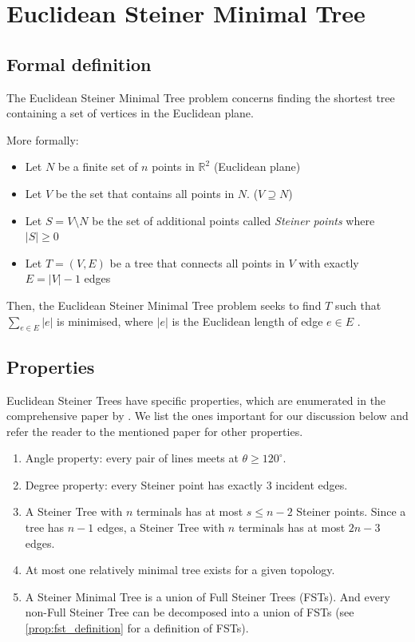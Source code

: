 \documentclass{l4proj}
\begin{document}
\section{Euclidean Steiner Minimal Tree}

\subsection{Formal definition}
The Euclidean Steiner Minimal Tree problem concerns finding the shortest tree containing a set of vertices in the Euclidean plane.

More formally:
\begin{itemize}
    \item Let $N$ be a finite set of $n$ points in $\mathbb{R}^2$ (Euclidean plane)
    \item Let $V$ be the set that contains all points in $N$. ($V \supseteq N$)
    \item Let $S = V \setminus N$ be the set of additional points called \textit{Steiner points} where $|S| \geq 0$
    \item Let $T = (V, E)$ be a tree that connects all points in $V$ with exactly $E = |V| - 1$ edges
\end{itemize}

Then, the Euclidean Steiner Minimal Tree problem seeks to find $T$ such that $\sum_{e \in E} |e|$ is minimised, where $|e|$ is the Euclidean length of edge $e \in E$ \citep{Brazil2014}.

\subsection{Properties}
\label{sec:esmt_properties}
Euclidean Steiner Trees have specific properties, which are enumerated in the comprehensive paper by \cite{Gilbert1968SteinerMT}. We list the ones important for our discussion below and refer the reader to the mentioned paper for other properties.

\begin{enumerate}
    \item Angle property: every pair of lines meets at $\theta \geq 120^\circ$.
    \item Degree property: every Steiner point has exactly 3 incident edges.
    \item \label{prop:esmt_fst} A Steiner Tree with $n$ terminals has at most $s \leq n - 2$ Steiner points. Since a tree has $n - 1$ edges, a Steiner Tree with $n$ terminals has at most $2n - 3$ edges.
    \item At most one relatively minimal tree exists for a given topology.
    \item \label{prop:smt_fst} A Steiner Minimal Tree is a union of Full Steiner Trees (FSTs). And every non-Full Steiner Tree can be decomposed into a union of FSTs (see \ref{prop:fst_definition} for a definition of FSTs).
\end{enumerate}
\end{document}

